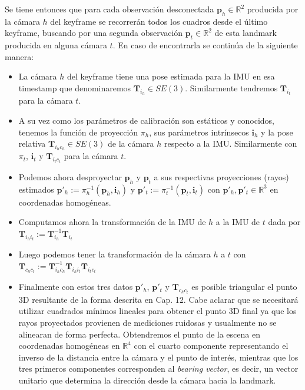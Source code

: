 \documentclass[ twoside,openright,titlepage,numbers=noenddot,%
                headinclude,footinclude,cleardoublepage=empty,abstract=on,
                BCOR=-5mm,paper=a4,fontsize=11pt
                ]{scrreprt}
\newcommand{\R}{\mathbb{R}}
\begin{document}
Se tiene entonces que para cada observación desconectada
\(\mathbf{p}_h \in \R^2\) producida por la cámara \(h\) del keyframe se
recorrerán todos los cuadros desde el último keyframe, buscando por una
segunda observación \(\mathbf{p}_t \in \R^2\) de esta landmark producida
en alguna cámara \(t\). En caso de encontrarla se continúa de la
siguiente manera:\newline

\begin{itemize}
\item
  La cámara \(h\) del keyframe tiene una pose estimada para la IMU en
  esa timestamp que denominaremos \(\mathbf{T}_{i_h} \in SE(3)\).
  Similarmente tendremos \(\mathbf{T}_{i_t}\) para la cámara \(t\).
\item
  A su vez como los parámetros de calibración son estáticos y conocidos,
  tenemos la función de proyección \(\pi_h\), sus parámetros intrínsecos
  \(\mathbf{i}_h\) y la pose relativa \(\mathbf{T}_{i_h c_h} \in SE(3)\)
  de la cámara \(h\) respecto a la IMU. Similarmente con \(\pi_t\),
  \(\mathbf{i}_t\) y \(\mathbf{T}_{i_t c_t}\) para la cámara \(t\).
\item
  Podemos ahora desproyectar \(\mathbf{p}_h\) y \(\mathbf{p}_t\) a sus
  respectivas proyecciones (rayos) estimados
  \(\mathbf{p}'_h := \pi^{-1}_h(\mathbf{p}_h, \mathbf{i}_h)\) y
  \(\mathbf{p}'_t := \pi^{-1}_t(\mathbf{p}_t, \mathbf{i}_t)\) con
  \(\mathbf{p}'_h, \mathbf{p}'_t \in \R^3\) en coordenadas homogéneas.
\item
  Computamos ahora la transformación de la IMU de \(h\) a la IMU de
  \(t\) dada por
  \(\mathbf{T}_{i_h i_t} := \mathbf{T}_{i_h}^{-1} \mathbf{T}_{i_t}\)
\item
  Luego podemos tener la transformación de la cámara \(h\) a \(t\) con
  \(\mathbf{T}_{c_h c_t} := \mathbf{T}_{i_h c_h}^{-1} \mathbf{T}_{i_h i_t} \mathbf{T}_{i_t c_t}\)
\item
  Finalmente con estos tres datos \(\mathbf{p}'_h\), \(\mathbf{p}'_t\) y
  \(\mathbf{T}_{c_h c_t}\) es posible triangular el punto 3D resultante
  de la forma descrita en \textcite{hartleyMultipleViewGeometry2004}
  Cap. 12. Cabe aclarar que se necesitará utilizar cuadrados mínimos
  lineales para obtener el punto 3D final ya que los rayos proyectados
  provienen de mediciones ruidosas y usualmente no se alinearan de forma
  perfecta. Obtendremos el punto de la escena en coordenadas homogéneas
  en \(\R^4\) con el cuarto componente representando el inverso de la
  distancia entre la cámara y el punto de interés, mientras que los tres
  primeros componentes corresponden al \emph{bearing vector}, es decir,
  un vector unitario que determina la dirección desde la cámara hacia la
  landmark.\newline
\end{itemize}
\end{document}
